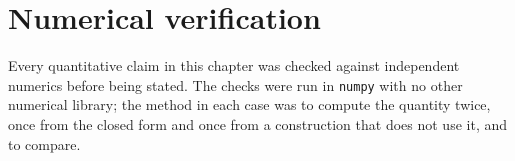 \renewcommand{\thesection}{\thechapter.\Alph{section}}
\setcounter{section}{0}


\section{Numerical verification}
\label{path:app:verification}

Every quantitative claim in this chapter was checked against independent
numerics before being stated. The checks were run in \texttt{numpy} with no other numerical library; the
method in each case was to compute the quantity twice, once from the closed
form and once from a construction that does not use it, and to compare.

